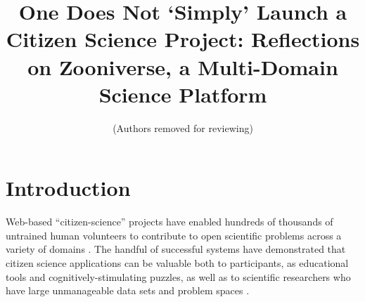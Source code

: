 \documentclass{sigchi}
\begin{document}
\title{One Does Not `Simply' Launch a Citizen Science Project: Reflections on Zooniverse, a Multi-Domain Science Platform}

 \author{ (Authors removed for reviewing) }
\maketitle

\begin{abstract}

\end{abstract}




\section{Introduction}

Web-based ``citizen-science'' projects have enabled hundreds of
thousands of untrained human volunteers to contribute to open
scientific problems across a variety of domains
\cite{citizen-science}.  The handful of successful systems have
demonstrated that citizen science applications can be valuable both to
participants, as educational tools and cognitively-stimulating
puzzles\cite{citizen-science-in-curricula}, as well as to scientific
researchers who have large unmanageable data sets and problem spaces
\cite{fortson-2011, lintott-08, lintott-11, simpson-12, davis-11}.



\end{document}
